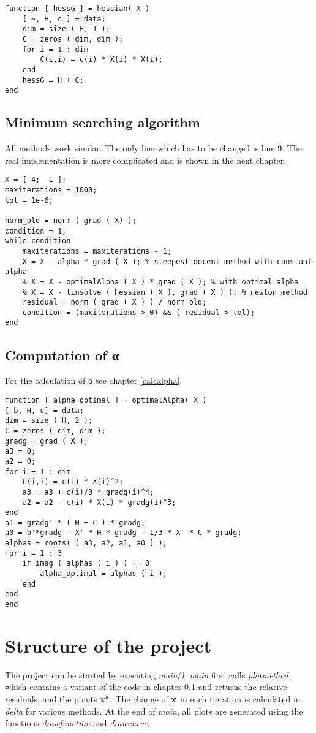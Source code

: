 \documentclass[a4paper,12pt]{article}
\newcommand{\code}[1]{\textit{#1}}
\begin{document}
\begin{lstlisting}
function [ hessG ] = hessian( X )
	[ ~, H, c ] = data;
	dim = size ( H, 1 );
	C = zeros ( dim, dim );
	for i = 1 : dim
		C(i,i) = c(i) * X(i) * X(i);
	end
	hessG = H + C;
end
\end{lstlisting}

\subsection{Minimum searching algorithm}\label{core}
All methods work similar. 
The only line which has to be changed is line 9.
The real implementation is more complicated and is shown in the next chapter.
\begin{lstlisting}
X = [ 4; -1 ];
maxiterations = 1000;
tol = 1e-6;

norm_old = norm ( grad ( X) );
condition = 1;
while condition
	maxiterations = maxiterations - 1;
	X = X - alpha * grad ( X ); % steepest decent method with constant alpha
	% X = X - optimalAlpha ( X ) * grad ( X ); % with optimal alpha
	% X = X - linsolve ( hessian ( X ), grad ( X ) ); % newton method
	residual = norm ( grad ( X ) ) / norm_old;
	condition = (maxiterations > 0) && ( residual > tol);
end
\end{lstlisting}

\subsection{Computation of α}
For the calculation of α see chapter \ref{calcalpha}.
\begin{lstlisting}
function [ alpha_optimal ] = optimalAlpha( X )
[ b, H, c] = data;
dim = size ( H, 2 );
C = zeros ( dim, dim );
gradg = grad ( X );
a3 = 0;
a2 = 0;
for i = 1 : dim
	C(i,i) = c(i) * X(i)^2;
	a3 = a3 + c(i)/3 * gradg(i)^4;
	a2 = a2 - c(i) * X(i) * gradg(i)^3;
end
a1 = gradg' * ( H + C ) * gradg;
a0 = b'*gradg - X' * H * gradg - 1/3 * X' * C * gradg;
alphas = roots( [ a3, a2, a1, a0 ] );
for i = 1 : 3
	if imag ( alphas ( i ) ) == 0
		alpha_optimal = alphas ( i );
	end
end
end
\end{lstlisting}
 
\section{Structure of the project}
The project can be started by executing \code{main()}. 
\code{main} first calls \code{plotmethod}, which contains a variant of the code in chapter \ref{core} and returns the relative residuals, and the points ${\bf x}^{k}$.
The change of $\bf x$ in each iteration is calculated in \code{delta} for various methods.
At the end of \code{main}, all plots are generated using the functions \code{drawfunction} and \code{drawcurve}.
\end{document}

